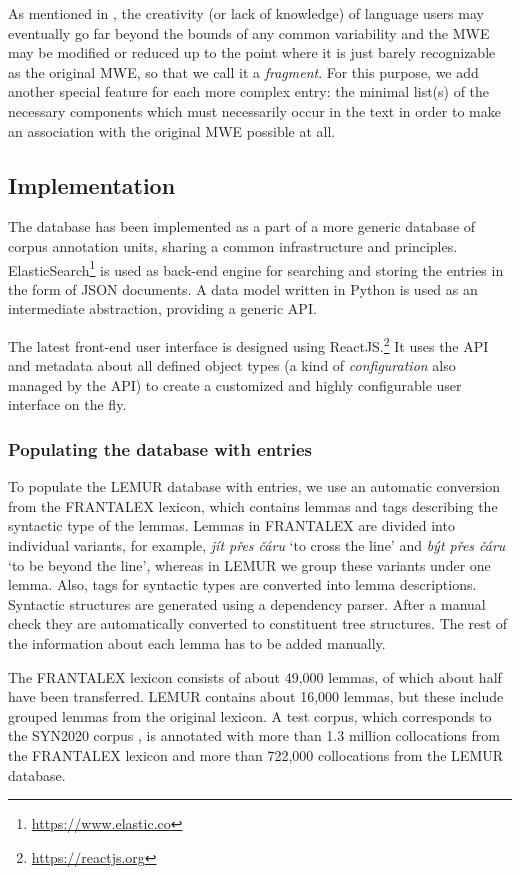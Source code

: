 \documentclass[output=paper,colorlinks,citecolor=brown]{langscibook}
\begin{document}
As mentioned in , the creativity (or lack of knowledge) of language users may eventually go far beyond the bounds of any common variability and the MWE may be modified or reduced up to the point where it is just barely recognizable as the original MWE, so that we call it a \emph{fragment}. For this purpose, we add another special feature for each more complex entry: the minimal list(s) of the necessary components which must necessarily occur in the text in order to make an association with the original MWE possible at all. 

\subsection{Implementation}

The database has been implemented as a part of a more generic database of corpus annotation units, sharing a common infrastructure and principles. ElasticSearch\footnote{\url{https://www.elastic.co}} is used as back-end engine for searching and storing the entries in the form of JSON documents. A data model written in Python is used as an intermediate abstraction, providing a generic API. 

The latest front-end user interface is designed using ReactJS.\footnote{\url{https://reactjs.org}} It uses the API and metadata about all defined object types (a kind of \textit{configuration} also managed by the API) to create a customized and highly configurable user interface on the fly.


\subsubsection{Populating the database with entries}

To populate the LEMUR database with entries, we use an automatic conversion from the FRANTALEX lexicon, which contains lemmas and tags describing the syntactic type of the lemmas. Lemmas in FRANTALEX are divided into individual variants, for example, \textit{jít přes čáru} `to cross the line' and \textit{být přes čáru} `to be beyond the line', whereas in LEMUR we group these variants under one lemma. Also, tags for syntactic types are converted into lemma descriptions. Syntactic structures are generated using a dependency parser. After a manual check they are automatically converted to constituent tree structures. The rest of the information about each lemma has to be added manually.

The FRANTALEX lexicon consists of about 49,000 lemmas, of which about half have been transferred. LEMUR contains about 16,000 lemmas, but these include grouped lemmas from the original lexicon. A test corpus, which corresponds to the SYN2020 corpus \citep{Jelinek:2021}, is annotated with more than 1.3 million collocations from the FRANTALEX lexicon and more than 722,000 collocations from the LEMUR database.
\end{document}
